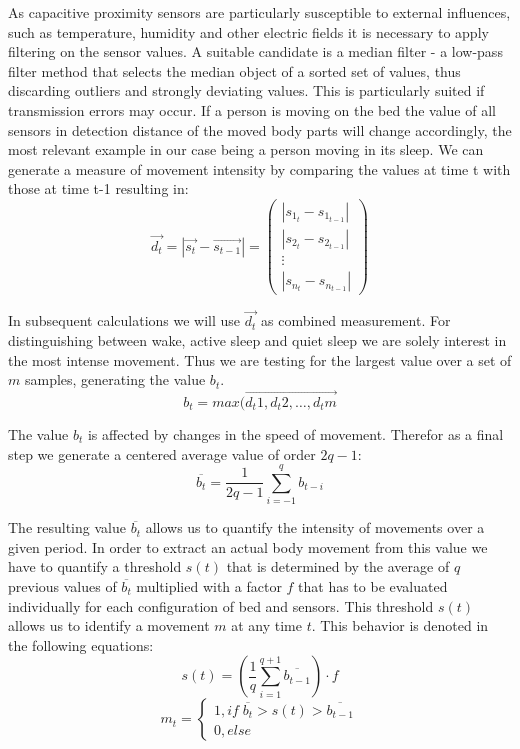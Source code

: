 As capacitive proximity sensors are particularly susceptible to external influences, such as temperature, humidity and other electric fields it is necessary to apply filtering on the sensor values. A suitable candidate is a median filter - a low-pass filter method that selects the median object of a sorted set of values, thus discarding outliers and strongly deviating values. This is particularly suited if transmission errors may occur.
If a person is moving on the bed the value of all sensors in detection distance of the moved body parts will change accordingly, the most relevant example in our case being a person moving in its sleep. We can generate a measure of movement intensity by comparing the values at time t with those at time t-1 resulting in:
\begin{equation}
\overrightarrow{d_t}=\left | \overrightarrow{s_t}-\overrightarrow{s_{t-1}} \right | = \begin{pmatrix}
\left | s_{1_t}-s_{1_{t-1}} \right |\\ 
\left | s_{2_t}-s_{2_{t-1}} \right |\\ 
\vdots \\ 
\left | s_{n_t}-s_{n_{t-1}} \right |
\end{pmatrix}
\end{equation}

In subsequent calculations we will use $\overrightarrow{d_t}$ as combined measurement. For distinguishing between wake, active sleep and quiet sleep we are solely interest in the most intense movement. Thus we are testing for the largest value over a set of $m$ samples, generating the value $b_t$.
\begin{equation}
b_t=max(\overrightarrow{d_t1, d_t2, \hdots, d_tm}
\end{equation}

The value $b_t$ is affected by changes in the speed of movement. Therefor as a final step we generate a centered average value of order $2q-1$:
\begin{equation}
\overline{b_t}=\frac{1}{2q-1}\sum_{i=-1}^q{b_{t-i}}
\end{equation}

The resulting value $\overline{b_t}$ allows us to quantify the intensity of movements over a given period. In order to extract an actual body movement from this value we have to quantify a threshold $s(t)$ that is determined by the average of $q$ previous values of $\overline{b_t}$ multiplied with a factor $f$ that has to be evaluated individually for each configuration of bed and sensors. This threshold $s(t)$ allows us to identify a movement $m$ at any time $t$. This behavior is denoted in the following equations:
\begin{equation}
s(t)=\left ( \frac{1}{q}\sum_{i=1}^{q+1}{\overline{b_{t-1}}} \right )\cdot f
\end{equation}
\begin{equation}
m_t=\left\{\begin{matrix}
1,if \; \overline{b_t}> s(t)>\overline{b_{{t-1}}}\\ 
0,else
\end{matrix}\right.
\end{equation}

